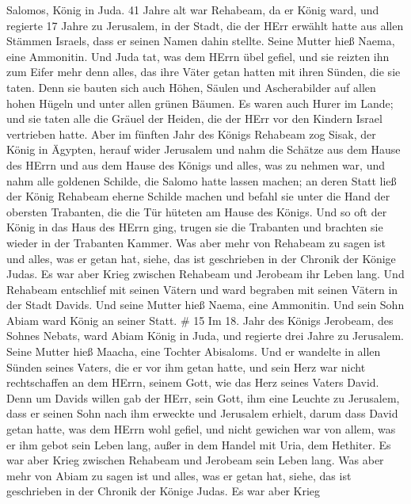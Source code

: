 Salomos, König in Juda. 41 Jahre alt war Rehabeam, da er König ward, und
regierte 17 Jahre zu Jerusalem, in der Stadt, die der HErr erwählt hatte
aus allen Stämmen Israels, dass er seinen Namen dahin stellte. Seine
Mutter hieß Naema, eine Ammonitin.  Und Juda tat, was dem
HErrn übel gefiel, und sie reizten ihn zum Eifer mehr denn alles, das
ihre Väter getan hatten mit ihren Sünden, die sie taten. 
Denn sie bauten sich auch Höhen, Säulen und Ascherabilder auf allen
hohen Hügeln und unter allen grünen Bäumen.  Es waren auch
Hurer im Lande; und sie taten alle die Gräuel der Heiden, die der HErr
vor den Kindern Israel vertrieben hatte.  Aber im fünften
Jahr des Königs Rehabeam zog Sisak, der König in Ägypten, herauf wider
Jerusalem  und nahm die Schätze aus dem Hause des HErrn und
aus dem Hause des Königs und alles, was zu nehmen war, und nahm alle
goldenen Schilde, die Salomo hatte lassen machen;  an deren
Statt ließ der König Rehabeam eherne Schilde machen und befahl sie unter
die Hand der obersten Trabanten, die die Tür hüteten am Hause des
Königs.  Und so oft der König in das Haus des HErrn ging,
trugen sie die Trabanten und brachten sie wieder in der Trabanten
Kammer.  Was aber mehr von Rehabeam zu sagen ist und alles,
was er getan hat, siehe, das ist geschrieben in der Chronik der Könige
Judas.  Es war aber Krieg zwischen Rehabeam und Jerobeam
ihr Leben lang.  Und Rehabeam entschlief mit seinen Vätern
und ward begraben mit seinen Vätern in der Stadt Davids. Und seine
Mutter hieß Naema, eine Ammonitin. Und sein Sohn Abiam ward König an
seiner Statt. \# 15  Im 18. Jahr des Königs Jerobeam, des
Sohnes Nebats, ward Abiam König in Juda,  und regierte drei
Jahre zu Jerusalem. Seine Mutter hieß Maacha, eine Tochter Abisaloms.
 Und er wandelte in allen Sünden seines Vaters, die er vor
ihm getan hatte, und sein Herz war nicht rechtschaffen an dem HErrn,
seinem Gott, wie das Herz seines Vaters David.  Denn um
Davids willen gab der HErr, sein Gott, ihm eine Leuchte zu Jerusalem,
dass er seinen Sohn nach ihm erweckte und Jerusalem erhielt,
 darum dass David getan hatte, was dem HErrn wohl gefiel,
und nicht gewichen war von allem, was er ihm gebot sein Leben lang,
außer in dem Handel mit Uria, dem Hethiter.  Es war aber
Krieg zwischen Rehabeam und Jerobeam sein Leben lang.  Was
aber mehr von Abiam zu sagen ist und alles, was er getan hat, siehe, das
ist geschrieben in der Chronik der Könige Judas. Es war aber Krieg
